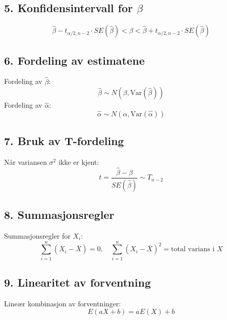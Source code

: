 \documentclass[a4paper,7pt,fleqn]{article}
\begin{document}
\begin{multicols}{2}
\begin{minipage}{\linewidth}
    \subsection*{5. Konfidensintervall for \(\beta\)}
    \[
    \hat{\beta} - t_{\alpha/2, n-2} \cdot SE(\hat{\beta}) < \beta < \hat{\beta} + t_{\alpha/2, n-2} \cdot SE(\hat{\beta})
    \]
    
    \end{minipage}
    \begin{minipage}{\linewidth}
    
    \subsection*{6. Fordeling av estimatene}
    Fordeling av \(\hat{\beta}\):
    \[
    \hat{\beta} \sim N\left(\beta, \text{Var}(\hat{\beta})\right)
    \]
    Fordeling av \(\hat{\alpha}\):
    \[
    \hat{\alpha} \sim N\left(\alpha, \text{Var}(\hat{\alpha})\right)
    \]
    
    
    \end{minipage}
    \begin{minipage}{\linewidth}
    
    \subsection*{7. Bruk av T-fordeling}
    Når variansen \(\sigma^2\) ikke er kjent:
    \[
    t = \frac{\hat{\beta} - \beta}{SE(\hat{\beta})} \sim T_{n-2}
    \]
    
    \end{minipage}
    \begin{minipage}{\linewidth}
    
    \subsection*{8. Summasjonsregler}
    Summasjonsregler for \(X_i\):
    \[
    \sum_{i=1}^n (X_i - \bar{X}) = 0, \quad \sum_{i=1}^n (X_i - \bar{X})^2 = \text{total varians i } X
    \]
    
    \end{minipage}
    \begin{minipage}{\linewidth}
    
    \subsection*{9. Linearitet av forventning}
    Lineær kombinasjon av forventninger:
    \[
    E(aX + b) = aE(X) + b
    \]
    

\end{minipage}
\end{multicols}
\end{document}
